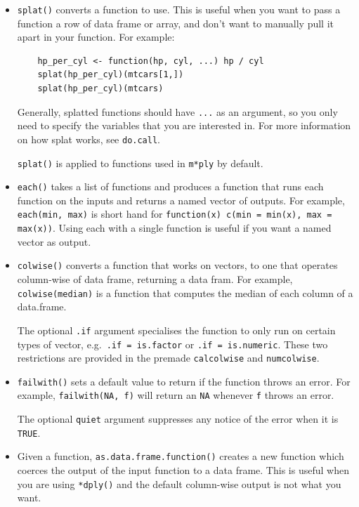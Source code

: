 \documentclass{scrartcl}
\newcommand{\f}[1]{\lstinline!#1()!}
\begin{document}
\begin{itemize}
  \item \f{splat} converts a function to use.  This is useful when you want to pass a function a row of data frame or array, and don't want to manually pull it apart in your function.  For example:
  
  \begin{verbatim}
    hp_per_cyl <- function(hp, cyl, ...) hp / cyl
    splat(hp_per_cyl)(mtcars[1,])
    splat(hp_per_cyl)(mtcars)
  \end{verbatim} 
  
  Generally, splatted functions should have {\tt ...} as an argument, so you only need to specify the variables that you are interested in.  For more information on how splat works, see {\tt do.call}.  
  
  \f{splat} is applied to functions used in {\tt m*ply} by default.

  \item \f{each} takes a list of functions and produces a function that runs  each function on the inputs and returns a named vector of outputs.   For example, {\tt each(min, max)} is short hand for {\tt function(x) c(min = min(x), max = max(x))}.  Using each with a single function is useful if you want a named vector as output.

  \item \f{colwise} converts a function that works on vectors, to one that operates column-wise of data frame, returning a data fram.  For example, {\tt colwise(median)} is a function that computes the median of each column of a data.frame.  
  
  The optional {\tt .if} argument specialises the function to only run on certain types of vector, e.g.\ {\tt .if = is.factor} or {\tt .if = is.numeric}.  These two restrictions are provided in the premade {\tt calcolwise} and {\tt numcolwise}.  
  
  \item \f{failwith} sets a default value to return if the function throws an error.  For example, {\tt failwith(NA, f)} will return an {\tt NA} whenever {\tt f} throws an error.  
  
  The optional {\tt quiet} argument suppresses any notice of the error when it is {\tt TRUE}.
  
  \item Given a function, \f{as.data.frame.function} creates a new function which coerces the output of the input function to a data frame.  This is useful when you are using \f{*dply} and the default column-wise output is not what you want.

\end{itemize}
\end{document}
